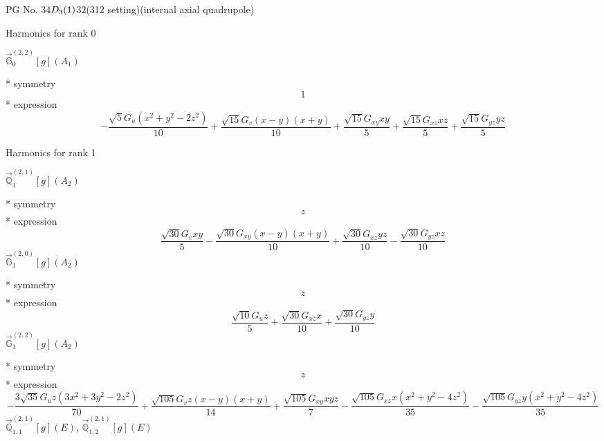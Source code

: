 \documentclass[fleqn,8pt]{jsarticle}
\begin{document}
\setcounter{MaxMatrixCols}{32}

\renewcommand{\tablename}{Table~}
\renewcommand{\figurename}{Figure~}
\begin{center}
\LARGE
PG No. 34\quad$D_{\rm 3}(1)$\quad$32$\quad(312 setting)\quad[ trigonal ] (internal axial quadrupole)
\end{center}

\noindent * Harmonics for rank 0

\noindent\quad $\vec{\mathbb{G}}_{0}^{(2,2)}[g](A_{1})$

\noindent\quad ** symmetry
\begin{dmath*}
1
\end{dmath*}
\noindent\quad ** expression
\begin{dmath*}
- \frac{\sqrt{5} G_{u} \left(x^{2} + y^{2} - 2 z^{2}\right)}{10} + \frac{\sqrt{15} G_{v} \left(x - y\right) \left(x + y\right)}{10} + \frac{\sqrt{15} G_{xy} x y}{5} + \frac{\sqrt{15} G_{xz} x z}{5} + \frac{\sqrt{15} G_{yz} y z}{5}
\end{dmath*}

\noindent * Harmonics for rank 1

\noindent\quad $\vec{\mathbb{Q}}_{1}^{(2,1)}[g](A_{2})$

\noindent\quad ** symmetry
\begin{dmath*}
z
\end{dmath*}
\noindent\quad ** expression
\begin{dmath*}
\frac{\sqrt{30} G_{v} x y}{5} - \frac{\sqrt{30} G_{xy} \left(x - y\right) \left(x + y\right)}{10} + \frac{\sqrt{30} G_{xz} y z}{10} - \frac{\sqrt{30} G_{yz} x z}{10}
\end{dmath*}
\noindent\quad $\vec{\mathbb{G}}_{1}^{(2,0)}[g](A_{2})$

\noindent\quad ** symmetry
\begin{dmath*}
z
\end{dmath*}
\noindent\quad ** expression
\begin{dmath*}
\frac{\sqrt{10} G_{u} z}{5} + \frac{\sqrt{30} G_{xz} x}{10} + \frac{\sqrt{30} G_{yz} y}{10}
\end{dmath*}
\noindent\quad $\vec{\mathbb{G}}_{1}^{(2,2)}[g](A_{2})$

\noindent\quad ** symmetry
\begin{dmath*}
z
\end{dmath*}
\noindent\quad ** expression
\begin{dmath*}
- \frac{3 \sqrt{35} G_{u} z \left(3 x^{2} + 3 y^{2} - 2 z^{2}\right)}{70} + \frac{\sqrt{105} G_{v} z \left(x - y\right) \left(x + y\right)}{14} + \frac{\sqrt{105} G_{xy} x y z}{7} - \frac{\sqrt{105} G_{xz} x \left(x^{2} + y^{2} - 4 z^{2}\right)}{35} - \frac{\sqrt{105} G_{yz} y \left(x^{2} + y^{2} - 4 z^{2}\right)}{35}
\end{dmath*}
\noindent\quad $\vec{\mathbb{Q}}_{1,1}^{(2,1)}[g](E)$, $\vec{\mathbb{Q}}_{1,2}^{(2,1)}[g](E)$
\end{document}
